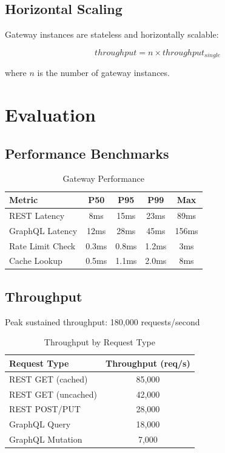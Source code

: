 \documentclass[11pt,a4paper]{article}
\begin{document}
\subsection{Horizontal Scaling}

Gateway instances are stateless and horizontally scalable:

\begin{equation}
throughput = n \times throughput_{single}
\end{equation}

where $n$ is the number of gateway instances.

\section{Evaluation}

\subsection{Performance Benchmarks}

\begin{table}[h]
\centering
\caption{Gateway Performance}
\begin{tabular}{lcccc}
\toprule
\textbf{Metric} & \textbf{P50} & \textbf{P95} & \textbf{P99} & \textbf{Max} \\
\midrule
REST Latency & 8ms & 15ms & 23ms & 89ms \\
GraphQL Latency & 12ms & 28ms & 45ms & 156ms \\
Rate Limit Check & 0.3ms & 0.8ms & 1.2ms & 3ms \\
Cache Lookup & 0.5ms & 1.1ms & 2.0ms & 8ms \\
\bottomrule
\end{tabular}
\end{table}

\subsection{Throughput}

Peak sustained throughput: 180,000 requests/second

\begin{table}[h]
\centering
\caption{Throughput by Request Type}
\begin{tabular}{lc}
\toprule
\textbf{Request Type} & \textbf{Throughput (req/s)} \\
\midrule
REST GET (cached) & 85,000 \\
REST GET (uncached) & 42,000 \\
REST POST/PUT & 28,000 \\
GraphQL Query & 18,000 \\
GraphQL Mutation & 7,000 \\
\bottomrule
\end{tabular}
\end{table}
\end{document}
